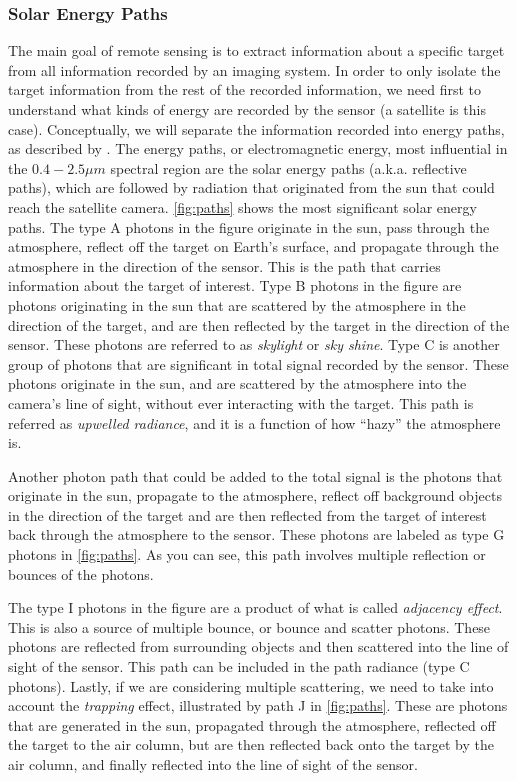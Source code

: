 \subsubsection{Solar Energy Paths}
\label{subsubsec:SolarPaths}
The main goal of remote sensing is to extract information about a specific target from all information recorded by an imaging system. In order to only isolate the target information from the rest of the recorded information, we need first to understand what kinds of energy are recorded by the sensor (a satellite is this case). Conceptually, we will separate the information recorded into energy paths, as described by \citet{Schott}. The energy paths, or electromagnetic energy, most influential in the $0.4-2.5\mu m$ spectral region are the solar energy paths (a.k.a. reflective paths), which are followed by radiation that originated from the sun that could reach the satellite camera. \autoref{fig:paths} shows the most significant solar energy paths. The type A photons in the figure originate in the sun, pass through the atmosphere, reflect off the target on Earth's surface, and propagate through the atmosphere in the direction of the sensor. This is the path that carries information about the target of interest. Type B photons in the figure are photons originating in the sun that are scattered by the atmosphere in the direction of the target, and are then reflected by the target in the direction of the sensor. These photons are referred to as {\it skylight} or {\it sky shine}. Type C is another group of photons that are significant in total signal recorded by the sensor. These photons originate in the sun, and are scattered by the atmosphere into the camera's line of sight, without ever interacting with the target. This path is referred as {\it upwelled radiance}, and it is a function of how ``hazy'' the atmosphere is.

Another photon path that could be added to the total signal is the photons that originate in the sun, propagate to the atmosphere, reflect off background objects in the direction of the target and are then reflected from the target of interest back through the atmosphere to the sensor. These photons are labeled as type G photons in \autoref{fig:paths}. As you can see, this path involves multiple reflection or bounces of the photons. 

The type I photons in the figure are a product of what is called {\it adjacency effect}. This is also a source of multiple bounce, or bounce and scatter photons. These photons are reflected from surrounding objects and then scattered into the line of sight of the sensor. This path can be included in the path radiance (type C photons). Lastly, if we are considering multiple scattering, we need to take into account the {\it trapping} effect, illustrated by path J in \autoref{fig:paths}. These are photons that are generated in the sun, propagated through the atmosphere, reflected off the target to the air column, but are then reflected back onto the target by the air column, and finally reflected into the line of sight of the sensor. 

